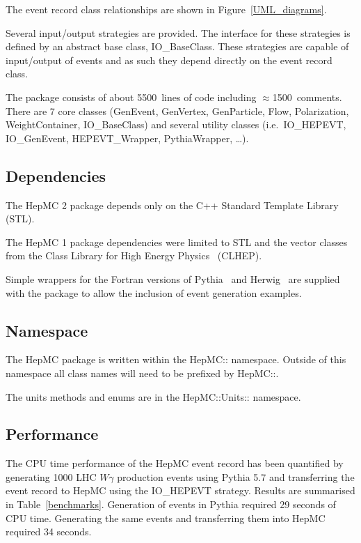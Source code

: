 \documentclass[11pt,letterpaper]{article}
\begin{document}
The event record class relationships are shown in Figure~\ref{UML_diagrams}.

Several input/output strategies are provided. The interface for these
strategies is defined by an abstract base class, IO\_BaseClass.  These
strategies are capable of input/output of events and as such they depend 
directly on the event record class.

The package consists of about 5500~lines of code including
$\approx$1500~comments. There are 7 core classes (GenEvent,
GenVertex, GenParticle, Flow, Polarization, WeightContainer,
IO\_BaseClass) and several utility classes (i.e.\ IO\_HEPEVT, IO\_GenEvent,
HEPEVT\_Wrapper, PythiaWrapper, \ldots).

\subsection{Dependencies}

The HepMC 2 package  depends only on the C++ Standard
Template Library~\cite{stl} (STL).

The HepMC 1 package dependencies were limited to STL 
and the vector classes from the
Class Library for High Energy Physics~\cite{clhep} (CLHEP).  

Simple wrappers for the Fortran versions of Pythia~\cite{Sjostrand:2001yb} 
and Herwig~\cite{herwig} are supplied with the
package to allow the inclusion of event generation examples.

\subsection{Namespace}

The HepMC package is written within the HepMC:: namespace. Outside of
this namespace all class names will need to be prefixed by HepMC::.

The units methods and enums are in the HepMC::Units:: namespace.

\subsection{Performance}

The CPU time performance of the HepMC event record has been quantified
by generating 1000 LHC $W\gamma$ production events using Pythia 5.7
and transferring the event record to HepMC using the IO\_HEPEVT
strategy. Results are summarised in Table~\ref{benchmarks}.
Generation of events in Pythia required 29 seconds of CPU time.
Generating the same events and transferring them into HepMC required
34 seconds.
\end{document}
